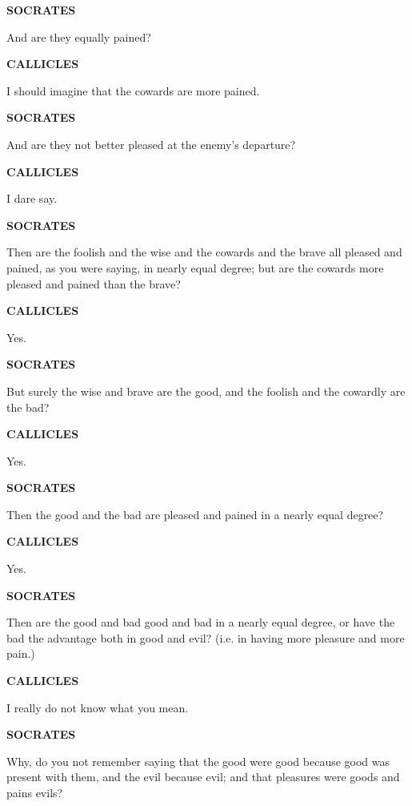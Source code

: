 \documentclass[11pt,letter]{article}
\begin{document}
\par \textbf{SOCRATES}
\par   And are they equally pained?

\par \textbf{CALLICLES}
\par   I should imagine that the cowards are more pained.

\par \textbf{SOCRATES}
\par   And are they not better pleased at the enemy’s departure?

\par \textbf{CALLICLES}
\par   I dare say.

\par \textbf{SOCRATES}
\par   Then are the foolish and the wise and the cowards and the brave all pleased and pained, as you were saying, in nearly equal degree; but are the cowards more pleased and pained than the brave?

\par \textbf{CALLICLES}
\par   Yes.

\par \textbf{SOCRATES}
\par   But surely the wise and brave are the good, and the foolish and the cowardly are the bad?

\par \textbf{CALLICLES}
\par   Yes.

\par \textbf{SOCRATES}
\par   Then the good and the bad are pleased and pained in a nearly equal degree?

\par \textbf{CALLICLES}
\par   Yes.

\par \textbf{SOCRATES}
\par   Then are the good and bad good and bad in a nearly equal degree, or have the bad the advantage both in good and evil? (i.e. in having more pleasure and more pain.)

\par \textbf{CALLICLES}
\par   I really do not know what you mean.

\par \textbf{SOCRATES}
\par   Why, do you not remember saying that the good were good because good was present with them, and the evil because evil; and that pleasures were goods and pains evils?
\end{document}

